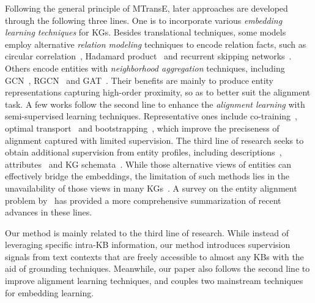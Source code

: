 \documentclass[11pt,a4paper]{article}
\begin{document}
Following the general principle of MTransE, later approaches are developed through the following three lines.
One is to incorporate various \emph{embedding learning techniques} for KGs.
Besides translational techniques, some models employ alternative \emph{relation modeling} techniques to encode relation facts, such as circular correlation~\cite{nickel2016holographic}, Hadamard product~\cite{hao2019joie} and recurrent skipping networks~\cite{guo2019learning}.
Others encode entities with \emph{neighborhood aggregation} techniques, including GCN~\cite{wang2018cross,yang2019aligning,cao2019multi,xu2019cross,wu2019jointly}, RGCN~\cite{wu2019relation} and GAT~\cite{zhu2019neighborhood}.
Their benefits are mainly to produce entity representations capturing high-order proximity, so as to better suit the alignment task.
A few works follow the second line to enhance the \emph{alignment learning} with semi-supervised learning techniques.
Representative ones include co-training~\cite{chen2018co}, optimal transport~\cite{pei2019transport} and bootstrapping~\cite{sun2018bootstrapping},
which improve the preciseness of alignment captured with limited supervision.
The third line of research seeks to obtain additional supervision from entity profiles, including descriptions~\cite{chen2018co,yang2019aligning}, attributes~\cite{sun2017cross,distiawanTrsedya2019,pei2019deg,yangcotsae} and KG schemata~\cite{zhang2019multi}.
While those alternative views of entities can effectively bridge the embeddings, the limitation of such methods lies in the unavailability of those views in many KGs~\cite{speer2017conceptnet,mitchell2018never,bond2013linking}.
A survey on the entity alignment problem by~\citet{sun2020benchmark} has provided a more comprehensive summarization of recent advances in these lines.


Our method is mainly related to the third line of research. While instead of leveraging specific intra-KB information, our method introduces supervision signals from text contexts that are freely accessible to almost any KBs with the aid of grounding techniques.
Meanwhile, our paper also follows the second line to improve alignment learning techniques, and couples two mainstream techniques for embedding learning.
\end{document}
